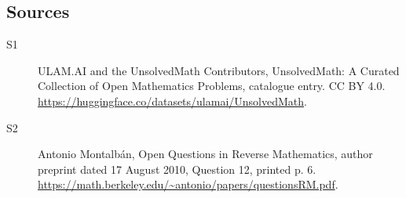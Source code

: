 \documentclass[11pt]{article}
\begin{document}
\subsection{Sources}
\begin{description}
\item[\hypertarget{source:statement:1}{S1}] ULAM.AI and the UnsolvedMath Contributors, UnsolvedMath: A Curated Collection of Open Mathematics Problems, catalogue entry. CC BY 4.0. \url{https://huggingface.co/datasets/ulamai/UnsolvedMath}.
\item[\hypertarget{source:statement:2}{S2}] Antonio Montalbán, Open Questions in Reverse Mathematics, author preprint dated 17 August 2010, Question 12, printed p. 6. \url{https://math.berkeley.edu/~antonio/papers/questionsRM.pdf}.
\end{description}
\label{end:statement}
\end{document}
